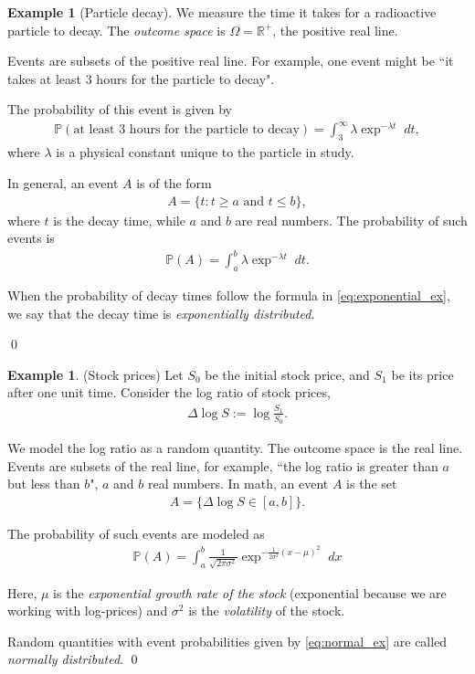 \documentclass[11pt]{article}
\theoremstyle{definition}
\newtheorem{example}[theorem]{Example}
\renewcommand{\P}{\mathbb{P}}
\newcommand{\R}{\mathbb{R}}
\begin{document}
\begin{example}[Particle decay]
  We measure the time it takes for a radioactive particle to decay.
  The \textit{outcome space} is $\Omega = \R^{+}$, the positive real line.

  Events are subsets of the positive real line. For example, one
  event might be ``it takes at least 3 hours for the particle to decay".

  The probability of this event is given by
  \begin{align*}
    \P(\text{at least 3 hours for the particle to decay}) =
    \int_{3}^\infty \lambda \exp^{-\lambda t} \;dt,
  \end{align*}
  where $\lambda$ is a physical constant unique to the particle in study.

  In general, an event $A$ is of the form
  \begin{align*}
    A = \{t : t \geq a \text{ and } t \leq b\},
  \end{align*}
  where $t$ is the decay time, while $a$ and $b$ are real numbers.
  The probability of such events is
  \begin{align}
    \P(A) =
    \int_a^b \lambda \exp^{-\lambda t} \;dt.
    \label{eq:exponential_ex}
  \end{align}

  When the probability of decay times follow the formula in \eqref{eq:exponential_ex},
  we say that the decay time is \textit{exponentially distributed}.

\qed
\end{example}

\begin{example}(Stock prices)
  Let $S_0$ be the initial stock price, and $S_1$ be its price after one unit time.
  Consider the log ratio of stock prices,
  \begin{align*}
    \Delta \log S := \log\frac{S_1}{S_0}.
  \end{align*}

  We model the log ratio as a random quantity.
  The outcome space is the real line. Events are subsets of the real line,
  for example, ``the log ratio is greater than $a$ but less than $b$",
  $a$ and $b$ real numbers. In math, an event $A$ is the set
  \begin{align*}
    A = \{\Delta \log S \in [a, b]\}.
  \end{align*}

  The probability of such events are modeled as
  \begin{align}
    \P(A) = \int_a^b \frac{1}{\sqrt{2\pi\sigma^2}}
    \exp^{-\frac{1}{2\sigma^2}(x - \mu)^2} \; dx
    \label{eq:normal_ex}
  \end{align}

  Here, $\mu$ is the \textit{exponential growth rate of the stock} (exponential because
  we are working with log-prices) and $\sigma^2$ is the \textit{volatility} of the stock.

  Random quantities with event probabilities
  given by \eqref{eq:normal_ex} are called \textit{normally distributed}.
\qed
\end{example}
\end{document}
